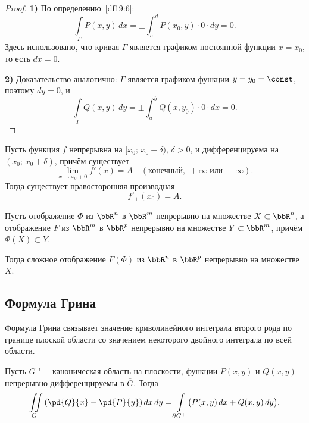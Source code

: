 \begin{proof}
\textbf{1)} По определению~\ref{df19:6}:
$$
\int\limits_{\Gamma} P(x, y)\,dx = \pm \int_c^d P(x_0, y) \cdot 0 \cdot dy = 0.
$$
Здесь использовано, что кривая $\Gamma$ является графиком постоянной функции $x = x_0$, то есть $dx = 0$.

\medskip

\textbf{2)} Доказательство аналогично: $\Gamma$ является графиком функции $y = y_0 = \const$, поэтому $dy = 0$, и
$$
\int\limits_{\Gamma} Q(x, y)\,dy = \pm \int_a^b Q(x, y_0) \cdot 0 \cdot dx = 0.
$$
\end{proof}

\begin{thm} \label{th4:16}
Пусть функция $f$ непрерывна на $[x_0;\, x_0 + \delta)$, $\delta > 0$, и дифференцируема на $(x_0;\, x_0 + \delta)$, причём существует
$$
\lim_{x \to x_0 + 0} f'(x) = A \quad (\text{конечный},\; +\infty\; \text{или}\; -\infty).
$$
Тогда существует правосторонняя производная
$$
f'_{+}(x_0) = A.
$$
\end{thm}

\begin{thm} \label{th9:5}
Пусть отображение $\Phi$ из $\bbR^n$ в $\bbR^m$ непрерывно на множестве $X \subset \bbR^n$, а отображение $F$ из $\bbR^m$ в $\bbR^p$ непрерывно на множестве $Y \subset \bbR^m$, причём $\Phi(X) \subset Y$.

Тогда сложное отображение $F(\Phi)$ из $\bbR^n$ в $\bbR^p$ непрерывно на множестве $X$.
\end{thm}

\subsection{Формула Грина}

Формула Грина связывает значение криволинейного интеграла второго рода по границе плоской области со значением некоторого двойного интеграла по всей области.

\begin{thm}
Пусть $G$ "--- каноническая область на плоскости, функции $P(x,y)$ и $Q(x,y)$ непрерывно дифференцируемы в $\overline{G}$. Тогда
$$
\iint\limits_{G} \left( \pd{Q}{x} - \pd{P}{y} \right) dx\,dy = \int\limits_{\partial G^+} \bigl( P(x,y)\,dx + Q(x,y)\,dy \bigr).
$$
\end{thm}


